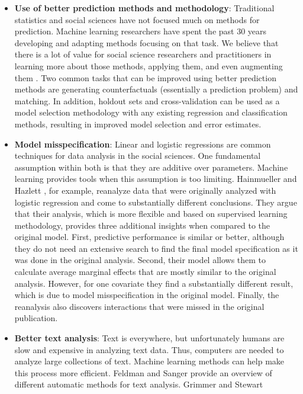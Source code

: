 \documentclass[]{krantz}
\begin{document}
\begin{itemize}
\item
  \textbf{Use of better prediction methods and methodology}: Traditional
  statistics and social sciences have not focused much on methods for
  prediction. Machine learning researchers have spent the past 30 years
  developing and adapting methods focusing on that task. We believe that
  there is a lot of value for social science researchers and
  practitioners in learning more about those methods, applying them, and
  even augmenting them \citep{Kleinberg2015}. Two common tasks that can
  be improved using better prediction methods are generating
  counterfactuals (essentially a prediction problem) and matching. In
  addition, holdout sets and cross-validation can be used as a model
  selection methodology with any existing regression and classification
  methods, resulting in improved model selection and error estimates.
\item
  \textbf{Model misspecification}: Linear and logistic regressions are
  common techniques for data analysis in the social sciences. One
  fundamental assumption within both is that they are additive over
  parameters. Machine learning provides tools when this assumption is
  too limiting. Hainmueller and Hazlett
  \citeyearpar{hainmueller2014kernel}, for example, reanalyze data that
  were originally analyzed with logistic regression and come to
  substantially different conclusions. They argue that their analysis,
  which is more flexible and based on supervised learning methodology,
  provides three additional insights when compared to the original
  model. First, predictive performance is similar or better, although
  they do not need an extensive search to find the final model
  specification as it was done in the original analysis. Second, their
  model allows them to calculate average marginal effects that are
  mostly similar to the original analysis. However, for one covariate
  they find a substantially different result, which is due to model
  misspecification in the original model. Finally, the reanalysis also
  discovers interactions that were missed in the original publication.
\item
  \textbf{Better text analysis}: Text is everywhere, but unfortunately
  humans are slow and expensive in analyzing text data. Thus, computers
  are needed to analyze large collections of text. Machine learning
  methods can help make this process more efficient. Feldman and Sanger
  \citeyearpar{FeldmanSanger} provide an overview of different automatic
  methods for text analysis. Grimmer and Stewart

\end{itemize}
\end{document}

